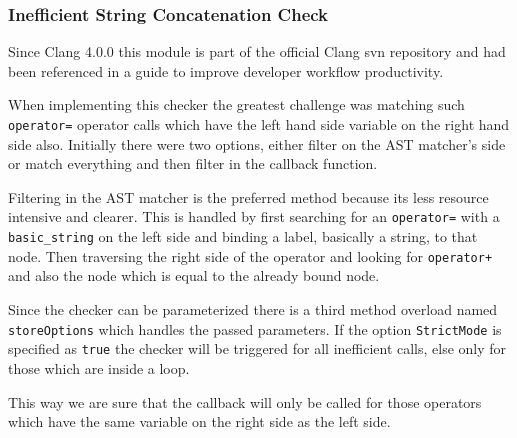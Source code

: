 \subsubsection{Inefficient String Concatenation Check}
\par Since Clang 4.0.0\cite{string_concat_release} this module is part of the official Clang svn repository and had been referenced in a guide to improve developer workflow productivity\cite{string_concat_ref}.
\par When implementing this checker the greatest challenge was matching such \verb|operator=| operator calls which have the left hand side variable on the right hand side also. Initially there were two options, either filter on the AST matcher's side or match everything and then filter in the callback function. \medskip
\par Filtering in the AST matcher is the preferred method because its less resource intensive and clearer. This is handled by first searching for an \verb|operator=| with a \verb|basic_string| on the left side and binding a label, basically a string, to that node. Then traversing the right side of the operator and looking for \verb|operator+| and also the node which is equal to the already bound node. \medskip
\par Since the checker can be parameterized there is a third method overload named \verb|storeOptions| which handles the passed parameters. If the option \verb|StrictMode| is specified as \verb|true| the checker will be triggered for all inefficient calls, else only for those which are inside a loop. \medskip
\par This way we are sure that the callback will only be called for those operators which have the same variable on the right side as the left side.
